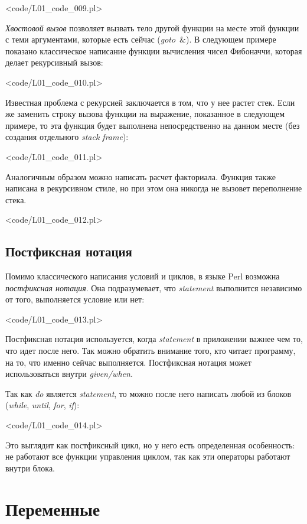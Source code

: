 \pr<code/L01_code_009.pl>

\textit{Хвостовой вызов} позволяет вызвать тело другой функции на месте этой функции с теми аргументами, которые есть сейчас (\textit{goto}~$\&$).
В следующем примере показано классическое написание функции вычисления чисел Фибоначчи, которая делает рекурсивный вызов:

\pr<code/L01_code_010.pl>

Известная проблема с рекурсией заключается в том, что у нее растет стек.
Если же заменить строку вызова функции на выражение, показанное в следующем примере, то эта функция будет выполнена непосредственно на данном месте (без создания отдельного \textit{stack frame}):

\pr<code/L01_code_011.pl>

Аналогичным образом можно написать расчет факториала.
Функция также написана в рекурсивном стиле, но при этом она никогда не вызовет переполнение стека.

\pr<code/L01_code_012.pl>

\subsection{Постфиксная нотация}
Помимо классического написания условий и циклов, в языке Perl возможна \textit{постфиксная нотация}.
Она подразумевает, что \textit{statement} выполнится независимо от того, выполняется условие или нет:

\pr<code/L01_code_013.pl>

Постфиксная нотация используется, когда \textit{statement} в приложении важнее чем то, что идет после него.
Так можно обратить внимание того, кто читает программу, на то, что именно сейчас выполняется.
Постфиксная нотация может использоваться внутри \textit{given/when}.

Так как \textit{do} является \textit{statement}, то можно после него написать любой из блоков (\textit{while}, \textit{until}, \textit{for}, \textit{if}):

\pr<code/L01_code_014.pl>

Это выглядит как постфиксный цикл, но у него есть определенная особенность: не работают все функции управления циклом, так как эти операторы работают внутри блока.

\renewcommand{\lasttiming}{580}
\section{Переменные} %

